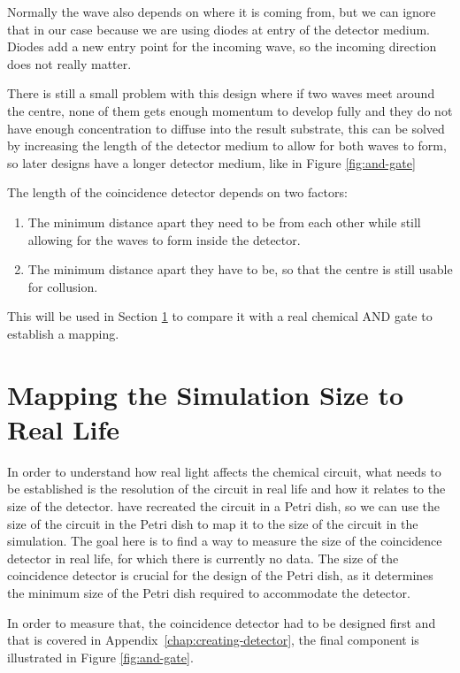 Normally the wave also depends on where it is coming from, but we can ignore that in our case because we are using diodes at entry of the detector medium. Diodes add a new entry point for the incoming wave, so the incoming direction does not really matter. 

There is still a small problem with this design where if two waves meet around the centre, none of them gets enough momentum to develop fully and they do not have enough concentration to diffuse into the result substrate, this can be solved by increasing the length of the detector medium to allow for both waves to form, so later designs have a longer detector medium, like in Figure \ref{fig:and-gate}

The length of the coincidence detector depends on two factors:
\begin{enumerate}
    \item The minimum distance apart they need to be from each other while still allowing for the waves to form inside the detector.
    \item The minimum distance apart they have to be, so that the centre is still usable for collusion.
\end{enumerate}

This will be used in Section \ref{sec:mapping-simulation-to-real-life} to compare it with a real chemical AND gate to establish a mapping.

\section{Mapping the Simulation Size to Real Life} \label{sec:mapping-simulation-to-real-life}
In order to understand how real light affects the chemical circuit, what needs to be established is the resolution of the circuit in real life and how it relates to the size of the detector. \cite{gorecki2003chemical} have recreated the circuit in a Petri dish, so we can use the size of the circuit in the Petri dish to map it to the size of the circuit in the simulation.
The goal here is to find a way to measure the size of the coincidence detector in real life, for which there is currently no data. The size of the coincidence detector is crucial for the design of the Petri dish, as it determines the minimum size of the Petri dish required to accommodate the detector. 

In order to measure that, the coincidence detector had to be designed first and that is covered in Appendix~\ref{chap:creating-detector}, the final component is illustrated in Figure \ref{fig:and-gate}.


